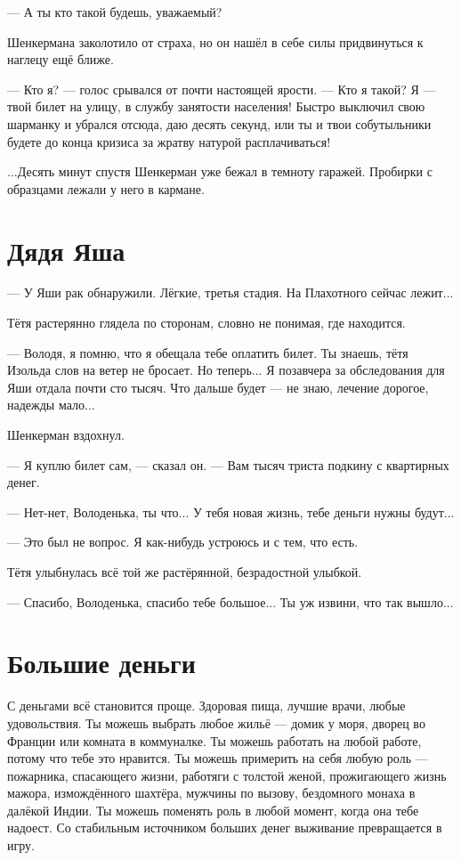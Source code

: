 \documentclass[a4paper,10pt,fleqn]{book}\usepackage{polyglossia}\setdefaultlanguage{english}\setotherlanguage{russian}\defaultfontfeatures{Ligatures=TeX,Mapping=tex-text} \usepackage{xcolor}\definecolor{lightgray}{HTML}{bbbbbb}\color{lightgray}\newcommand{\ml}[3]{\textcolor{black}{#3}}
\begin{document}
--- А ты кто такой будешь, уважаемый?

Шенкермана заколотило от страха, но он нашёл в себе силы придвинуться к наглецу ещё ближе.

--- Кто я? --- голос срывался от почти настоящей ярости.
--- Кто я такой?
Я --- твой билет на улицу, в службу занятости населения!
Быстро выключил свою шарманку и убрался отсюда, даю десять секунд, или ты и твои собутыльники будете до конца кризиса за жратву натурой расплачиваться!

...Десять минут спустя Шенкерман уже бежал в темноту гаражей.
Пробирки с образцами лежали у него в кармане.

\section{Дядя Яша}

--- У Яши рак обнаружили.
Лёгкие, третья стадия.
На Плахотного сейчас лежит...

Тётя растерянно глядела по сторонам, словно не понимая, где находится.

--- Володя, я помню, что я обещала тебе оплатить билет.
Ты знаешь, тётя Изольда слов на ветер не бросает.
Но теперь...
Я позавчера за обследования для Яши отдала почти сто тысяч.
Что дальше будет --- не знаю, лечение дорогое, надежды мало...

Шенкерман вздохнул.

--- Я куплю билет сам, --- сказал он.
--- Вам тысяч триста подкину с квартирных денег.

--- Нет-нет, Володенька, ты что...
У тебя новая жизнь, тебе деньги нужны будут...

--- Это был не вопрос.
Я как-нибудь устроюсь и с тем, что есть.

Тётя улыбнулась всё той же растёрянной, безрадостной улыбкой.

--- Спасибо, Володенька, спасибо тебе большое...
Ты уж извини, что так вышло...

\section{Большие деньги}

С деньгами всё становится проще.
Здоровая пища, лучшие врачи, любые удовольствия.
Ты можешь выбрать любое жильё --- домик у моря, дворец во Франции или комната в коммуналке.
Ты можешь работать на любой работе, потому что тебе это нравится.
Ты можешь примерить на себя любую роль --- пожарника, спасающего жизни, работяги с толстой женой, прожигающего жизнь мажора, измождённого шахтёра, мужчины по вызову, бездомного монаха в далёкой Индии.
Ты можешь поменять роль в любой момент, когда она тебе надоест.
Со стабильным источником больших денег выживание превращается в игру.
\end{document}
